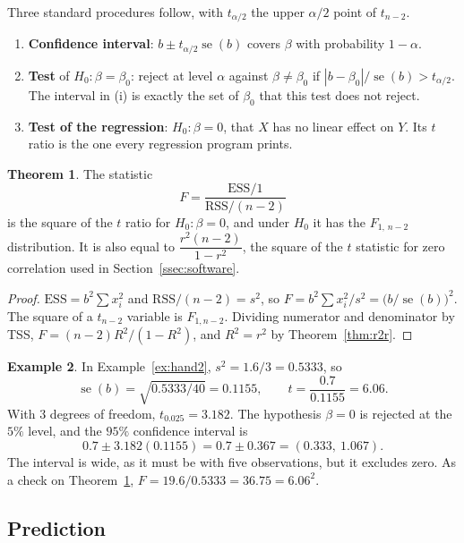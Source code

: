 \documentclass[11pt,a4paper]{article}
\numberwithin{equation}{section}
\theoremstyle{definition}
\newtheorem{thm}{Theorem}[subsection]
\newtheorem{exa}[thm]{Example}
\begin{document}
Three standard procedures follow, with $t_{\alpha/2}$ the upper $\alpha/2$ point of $t_{n-2}$.
\begin{enumerate}[label=(\roman*)]
\item \textbf{Confidence interval}: $b \pm t_{\alpha/2}\operatorname{se}(b)$ covers $\beta$ with probability $1 - \alpha$.
\item \textbf{Test} of $H_0\colon \beta = \beta_0$: reject at level $\alpha$ against $\beta \neq \beta_0$ if
$|b - \beta_0|/\operatorname{se}(b) > t_{\alpha/2}$. The interval in (i) is exactly the set of $\beta_0$ that this test does not reject.
\item \textbf{Test of the regression}: $H_0\colon \beta = 0$, that $X$ has no linear effect on $Y$. Its $t$ ratio is the one every regression program prints.
\end{enumerate}

\begin{thm}
\label{thm:ft2}
The statistic
\[
F = \frac{\text{ESS}/1}{\text{RSS}/(n-2)}
\]
is the square of the $t$ ratio for $H_0\colon \beta = 0$, and under $H_0$ it has the $F_{1,\,n-2}$ distribution. It is also equal to
$\dfrac{r^2(n-2)}{1 - r^2}$, the square of the $t$ statistic for zero correlation used in Section~\ref{ssec:software}.
\end{thm}

\begin{proof}
$\text{ESS} = b^2\sum x_i^2$ and $\text{RSS}/(n-2) = s^2$, so $F = b^2\sum x_i^2/s^2 = \bigl(b/\operatorname{se}(b)\bigr)^2$. The square of a $t_{n-2}$ variable
is $F_{1,n-2}$. Dividing numerator and denominator by TSS, $F = (n-2)R^2/(1 - R^2)$, and $R^2 = r^2$ by Theorem~\ref{thm:r2r}.
\end{proof}

\begin{exa}
\label{ex:hand2inf}
In Example~\ref{ex:hand2}, $s^2 = 1.6/3 = 0.5333$, so
\[
\operatorname{se}(b) = \sqrt{0.5333/40} = 0.1155, \qquad t = \frac{0.7}{0.1155} = 6.06 .
\]
With $3$ degrees of freedom, $t_{0.025} = 3.182$. The hypothesis $\beta = 0$ is rejected at the $5\%$ level, and the $95\%$ confidence interval is
\[
0.7 \pm 3.182(0.1155) = 0.7 \pm 0.367 = (0.333,\ 1.067) .
\]
The interval is wide, as it must be with five observations, but it excludes zero. As a check on Theorem~\ref{thm:ft2},
$F = 19.6/0.5333 = 36.75 = 6.06^2$.
\end{exa}

\subsection{Prediction}
\label{ssec:pred2}
\end{document}
